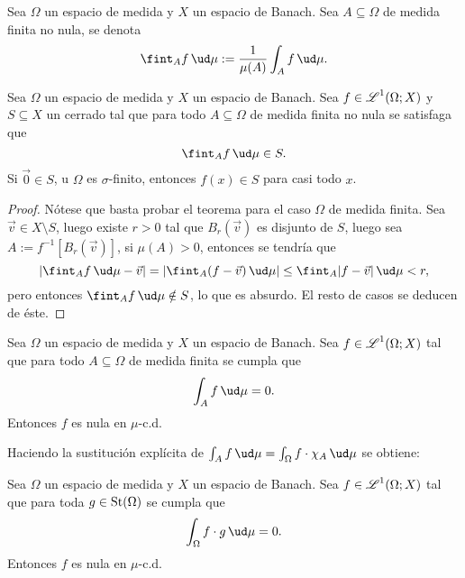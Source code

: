 
\begin{mydef}
	Sea $\Omega$ un espacio de medida y $X$ un espacio de Banach.
	Sea $A \subseteq \Omega$ de medida finita no nula, se denota
	$$ \fint_{A} f \, \ud \mu := \frac{1}{\mu(A)} \int_{A} f \, \ud \mu. $$
\end{mydef}

\begin{thm}\label{thm:averaging_int}
	Sea $\Omega$ un espacio de medida y $X$ un espacio de Banach.
	Sea $f \in \operatorname{\mathscr{L}}^1(\Omega; X)$ y $S \subseteq X$ un cerrado tal que para todo $A \subseteq \Omega$ de medida finita no nula
	se satisfaga que
	$$ \fint_{A} f \, \ud \mu \in S. $$
	Si $\Vec 0 \in S$, u $\Omega$ es $\sigma$-finito, entonces $f(x) \in S$ para casi todo $x$.
\end{thm}
\begin{proof}
	Nótese que basta probar el teorema para el caso $\Omega$ de medida finita.
	Sea $\vec v\in X \setminus S$, luego existe $r > 0$ tal que $B_r(\vec v)$ es disjunto de $S$, luego
	sea $A := f^{-1}[ B_r(\vec v) ]$, si $\mu(A) > 0$, entonces se tendría que
	$$ \left| \fint_{A} f \, \ud \mu - \vec v \right| = \left| \fint_{A} (f - \vec v) \, \ud \mu \right| \le \fint_{A} |f - \vec v| \, \ud \mu < r, $$
	pero entonces $\fint_{A} f \, \ud \mu \notin S$, lo que es absurdo.
	El resto de casos se deducen de éste.
\end{proof}
\begin{cor}
	Sea $\Omega$ un espacio de medida y $X$ un espacio de Banach.
	Sea $f \in \operatorname{\mathscr{L}}^1(\Omega; X)$ tal que para todo $A \subseteq \Omega$ de medida finita se cumpla que
	$$ \int_{A} f \, \ud \mu = 0. $$
	Entonces $f$ es nula en $\mu$-c.d.
\end{cor}
Haciendo la sustitución explícita de $ \int_{A} f \, \ud \mu = \int_{\Omega} f\cdot\chi_A \, \ud \mu $ se obtiene:
\begin{cor}
	Sea $\Omega$ un espacio de medida y $X$ un espacio de Banach.
	Sea $f \in \operatorname{\mathscr{L}}^1(\Omega; X)$ tal que para toda $g \in \operatorname{St}(\Omega)$ se cumpla que
	$$ \int_{\Omega} f\cdot g \, \ud \mu = 0. $$
	Entonces $f$ es nula en $\mu$-c.d.
\end{cor}

